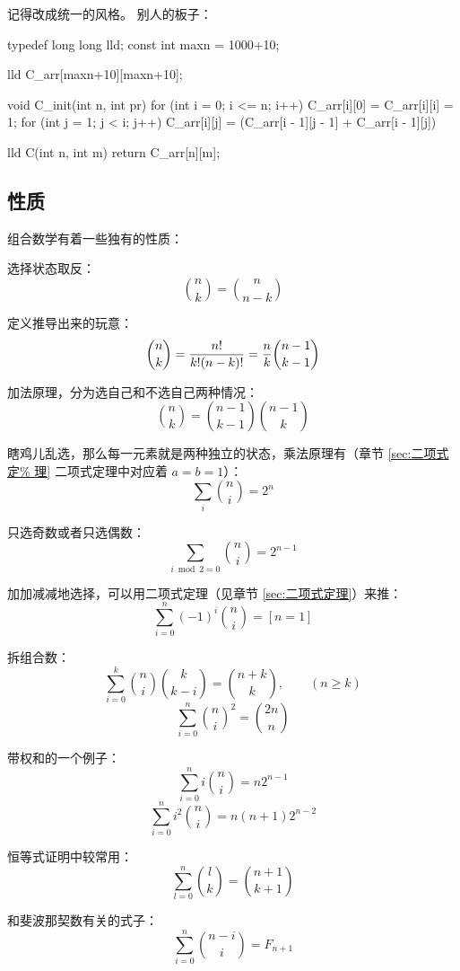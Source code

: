\TODOtag 记得改成统一的风格。
别人的板子：
\begin{Cpp}
typedef long long lld;
const int maxn = 1000+10;

lld C_arr[maxn+10][maxn+10];

void C_init(int n, int pr) {
	for (int i = 0; i <= n; i++) {
		C_arr[i][0] = C_arr[i][i] = 1;
		for (int j = 1; j < i; j++)
			C_arr[i][j] = (C_arr[i - 1][j - 1]
                + C_arr[i - 1][j]) %
	}
}

lld C(int n, int m) {
	return C_arr[n][m];
}
\end{Cpp}



\subsection{性质}
组合数学有着一些独有的性质：

选择状态取反：\[
    {n \choose k} = {n \choose n - k}
\]

定义推导出来的玩意：\[
    {n \choose k} = {n! \over k! (n - k)!} = {n \over k} {n - 1 \choose k - 1}
\]

加法原理，分为选自己和不选自己两种情况：\[
    {n \choose k} = {n - 1 \choose k - 1} {n - 1 \choose k}
\]

瞎鸡儿乱选，那么每一元素就是两种独立的状态，乘法原理有（章节 \ref{sec:二项式定%
理} 二项式定理中对应着 $a = b = 1$）：\[ \sum_{i} {n \choose i} = 2^n \]

只选奇数或者只选偶数：\[
    \sum_{i \bmod 2 = 0} {n \choose i} = 2^{n - 1}
\]

加加减减地选择，可以用二项式定理（见章节 \ref{sec:二项式定理}）来推：\[
    \sum^{n}_{i = 0} (-1)^i {n \choose i} = [n = 1]
\]

拆组合数：\[
    \sum_{i=0}^{k} {n \choose i} {k \choose k - i} = {n + k \choose k}, \qquad (n
    \ge k)
\] \[
    \sum_{i=0}^{n} {n \choose i}^2 = {2n \choose n}
\]

带权和的一个例子：\[
    \sum_{i=0}^{n} i{n \choose i} = n2^{n - 1}
\] \[
    \sum_{i=0}^{n} i^2{n \choose i} = n(n + 1)2^{n - 2}
\]

恒等式证明中较常用：\[
    \sum_{l=0}^{n} {l \choose k} = {n + 1 \choose k + 1}
\]

和斐波那契数有关的式子：\[
    \sum_{i = 0}^{n} {n - i \choose i} = F_{n + 1}
\]
